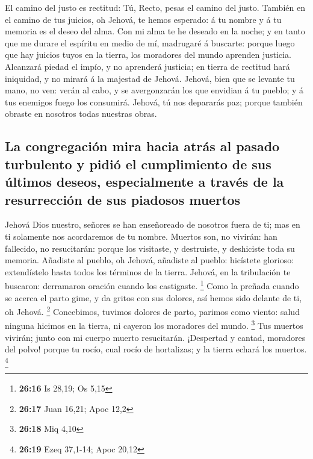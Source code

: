  El camino del justo es rectitud: Tú, Recto, pesas el camino
del justo.  También en el camino de tus juicios, oh Jehová,
te hemos esperado: á tu nombre y á tu memoria es el deseo del alma.
 Con mi alma te he deseado en la noche; y en tanto que me
durare el espíritu en medio de mí, madrugaré á buscarte: porque luego
que hay juicios tuyos en la tierra, los moradores del mundo aprenden
justicia.  Alcanzará piedad el impío, y no aprenderá
justicia; en tierra de rectitud hará iniquidad, y no mirará á la
majestad de Jehová.  Jehová, bien que se levante tu mano,
no ven: verán al cabo, y se avergonzarán los que envidian á tu pueblo; y
á tus enemigos fuego los consumirá.  Jehová, tú nos
depararás paz; porque también obraste en nosotros todas nuestras obras.

\hypertarget{la-congregaciuxf3n-mira-hacia-atruxe1s-al-pasado-turbulento-y-pidiuxf3-el-cumplimiento-de-sus-uxfaltimos-deseos-especialmente-a-travuxe9s-de-la-resurrecciuxf3n-de-sus-piadosos-muertos}{%
\subsection{La congregación mira hacia atrás al pasado turbulento y
pidió el cumplimiento de sus últimos deseos, especialmente a través de
la resurrección de sus piadosos
muertos}\label{la-congregaciuxf3n-mira-hacia-atruxe1s-al-pasado-turbulento-y-pidiuxf3-el-cumplimiento-de-sus-uxfaltimos-deseos-especialmente-a-travuxe9s-de-la-resurrecciuxf3n-de-sus-piadosos-muertos}}

 Jehová Dios nuestro, señores se han enseñoreado de
nosotros fuera de ti; mas en ti solamente nos acordaremos de tu nombre.
 Muertos son, no vivirán: han fallecido, no resucitarán:
porque los visitaste, y destruiste, y deshiciste toda su memoria.
 Añadiste al pueblo, oh Jehová, añadiste al pueblo:
hicístete glorioso: extendístelo hasta todos los términos de la tierra.
 Jehová, en la tribulación te buscaron: derramaron oración
cuando los castigaste. \footnote{\textbf{26:16} Is 28,19; Os 5,15}
 Como la preñada cuando se acerca el parto gime, y da
gritos con sus dolores, así hemos sido delante de ti, oh Jehová.
\footnote{\textbf{26:17} Juan 16,21; Apoc 12,2} 
Concebimos, tuvimos dolores de parto, parimos como viento: salud ninguna
hicimos en la tierra, ni cayeron los moradores del mundo. \footnote{\textbf{26:18}
  Miq 4,10}  Tus muertos vivirán; junto con mi cuerpo
muerto resucitarán. ¡Despertad y cantad, moradores del polvo! porque tu
rocío, cual rocío de hortalizas; y la tierra echará los muertos.
\footnote{\textbf{26:19} Ezeq 37,1-14; Apoc 20,12}


